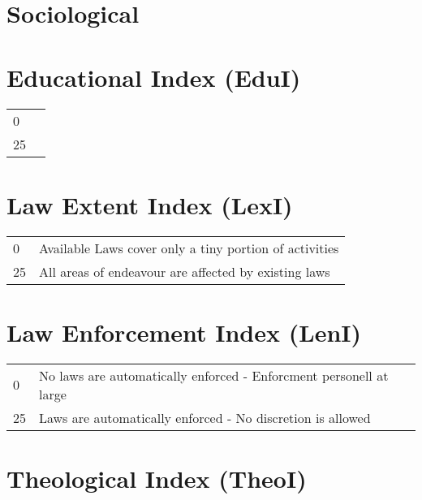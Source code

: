 \section{Sociological}

\section{Educational Index (EduI)}
\begin{tabular}{ll}
	0   &  \\
	25  &  \\
\end{tabular}

\section{Law Extent Index (LexI)}
\begin{tabular}{ll}
	0    & Available Laws cover only a tiny portion of activities    \\
	25   & All areas of endeavour are affected by existing laws    \\
\end{tabular}

\section{Law Enforcement Index (LenI)}
\begin{tabular}{ll}
	0   & No laws are automatically enforced - Enforcment personell at large \\
	25  & Laws are automatically enforced - No discretion is allowed \\
\end{tabular}

\section{Theological Index     (TheoI)}


